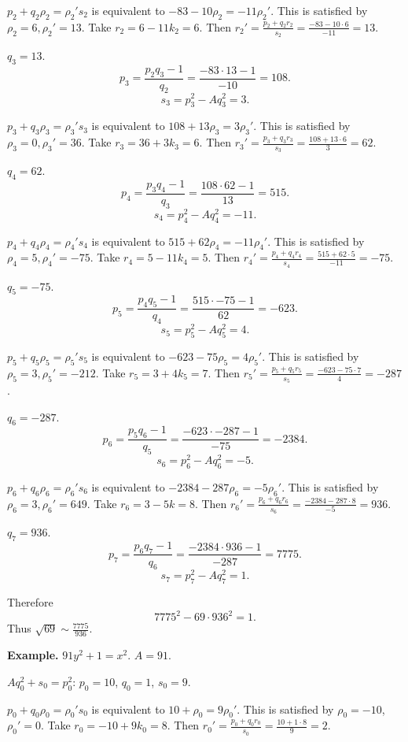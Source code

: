 \documentclass{article}
\theoremstyle{definition}
\theoremstyle{definition}
\begin{document}
$p_2+q_2\rho_2=\rho_2's_2$ is equivalent to
$-83 -10\rho_2 = -11\rho_2'$. This is satisfied by
$\rho_2=6, \rho_2'=13$. 
Take $r_2=6-11k_2 = 6$.
Then
$r_2'=\frac{p_2+q_2r_2}{s_2}=\frac{-83-10\cdot 6}{-11}=13$.

$q_3=13$. 
\[
p_3 = \frac{p_2q_3-1}{q_2} = \frac{-83 \cdot 13 - 1}{-10} = 108.
\]
\[
s_3 = p_3^2-Aq_3^2 = 3.
\]

$p_3+q_3\rho_3=\rho_3's_3$ is equivalent to
$108+13\rho_3=3\rho_3'$. This is satisfied by 
$\rho_3=0, \rho_3'=36$.
Take $r_3=36+3k_3=6$. 
Then $r_3'=\frac{p_3+q_3r_3}{s_3} = \frac{108+13\cdot 6}{3} = 62$.

$q_4=62$.
\[
p_4 = \frac{p_3q_4-1}{q_3} = \frac{108 \cdot 62 - 1}{13} = 515.
\]
\[
s_4 = p_4^2-Aq_4^2 = -11.
\]

$p_4+q_4\rho_4=\rho_4's_4$ is equivalent to
$515 + 62\rho_4 = -11\rho_4'$.
This is satisfied by
$\rho_4= 5, \rho_4'=-75$. 
Take $r_4 = 5  - 11k_4= 5$. 
Then $r_4' = \frac{p_4+q_4r_4}{s_4} = \frac{515 + 62 \cdot 5}{-11} = -75$.

$q_5=-75$.
\[
p_5 = \frac{p_4q_5-1}{q_4} = \frac{515\cdot -75 - 1}{62} = -623.
\]
\[
s_5 = p_5^2-Aq_5^2 = 4.
\]

$p_5+q_5\rho_5=\rho_5's_5$ is equivalent to
$-623 -75\rho_5 = 4\rho_5'$.
This is satisfied by $\rho_5=3, \rho_5'=-212$. 
Take $r_5 = 3 + 4k_5 = 7$.
Then $r_5' = \frac{p_5+q_5r_5}{s_5} = \frac{-623 - 75 \cdot 7}{4}
=-287$. 

$q_6=-287$.
\[
p_6 = \frac{p_5q_6-1}{q_5} = \frac{-623 \cdot -287-1}{-75} = -2384.
\]
\[
s_6 = p_6^2-Aq_6^2 = -5.
\]

$p_6+q_6\rho_6=\rho_6's_6$ is equivalent to
$-2384 -287 \rho_6 = -5\rho_6'$. 
This is satisfied by $\rho_6=3, \rho_6'=649$.
Take $r_6 = 3 - 5k=8$.
Then $r_6' = \frac{p_6+q_6r_6}{s_6}
=\frac{-2384 - 287 \cdot 8}{-5} = 936$.

$q_7 = 936$.
\[
p_7 = \frac{p_6q_7-1}{q_6} = \frac{-2384 \cdot 936-1}{-287} = 7775.
\]
\[
s_7 = p_7^2-Aq_7^2 =  1.
\]

Therefore
\[
7775^2 - 69 \cdot 936^2 = 1.
\]
Thus $\sqrt{69} \sim \frac{7775}{936}$. 




\textbf{Example.} $91y^2+1=x^2$. 
$A=91$.

$Aq_0^2+s_0=p_0^2$:
$p_0=10$, $q_0=1$, $s_0=9$. 

$p_0+q_0\rho_0 = \rho_0's_0$ is equivalent to
$10 +\rho_0=9\rho_0'$. This is satisfied by
$\rho_0=-10$, $\rho_0'=0$.
Take $r_0 = -10 + 9k_0 = 8$. 
Then $r_0'= \frac{p_0+q_0r_0}{s_0}=
\frac{10+1 \cdot 8}{9} = 2$.
\end{document}
